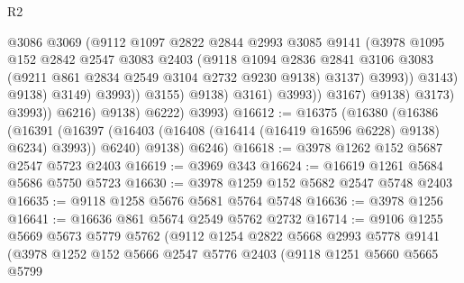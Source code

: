 \begin{lexlean}{R2}
\begin{coremodule}
                                          @3086
                                          @3069
                                          (@9112
                                            @1097
                                            @2822
                                            @2844
                                            @2993
                                            @3085
                                            @9141
                                            (@3978
                                              @1095
                                              @152
                                              @2842
                                              @2547
                                              @3083
                                              @2403
                                              (@9118
                                                @1094
                                                @2836
                                                @2841
                                                @3106
                                                @3083
                                                (@9211 @861 @2834 @2549 @3104 @2732 @9230 @9138)
                                                @3137)
                                              @3993))
                                          @3143)
                                        @9138)
                                      @3149)
                                    @3993))
                                @3155)
                              @9138)
                            @3161)
                          @3993))
                      @3167)
                    @9138)
                  @3173)
                @3993))
            @6216)
          @9138)
        @6222)
      @3993)
@16612 := @16375
    (@16380
      (@16386
        (@16391 (@16397 (@16403 (@16408 (@16414 (@16419 @16596 @6228) @9138) @6234) @3993)) @6240)
        @9138)
      @6246)
@16618 := @3978 @1262 @152 @5687 @2547 @5723 @2403
@16619 := @3969 @343
@16624 := @16619 @1261 @5684 @5686 @5750 @5723
@16630 := @3978 @1259 @152 @5682 @2547 @5748 @2403
@16635 := @9118 @1258 @5676 @5681 @5764 @5748
@16636 := @3978 @1256
@16641 := @16636 @861 @5674 @2549 @5762 @2732
@16714 := @9106
    @1255
    @5669
    @5673
    @5779
    @5762
    (@9112
      @1254
      @2822
      @5668
      @2993
      @5778
      @9141
      (@3978
        @1252
        @152
        @5666
        @2547
        @5776
        @2403
        (@9118
          @1251
          @5660
          @5665
          @5799

\end{coremodule}
\end{lexlean}
